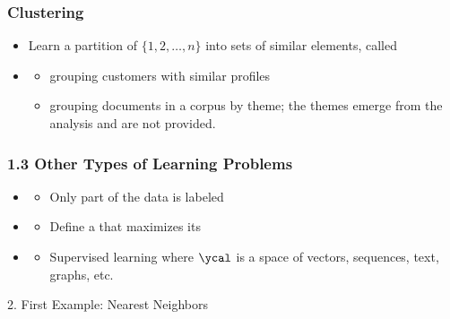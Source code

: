 \begin{frame}
  \frametitle{Clustering}
  \begin{itemize}
  \item[] Learn a partition of $\{1, 2, \dots, n\}$ into sets
    of similar elements, called 
  \item {}
    \begin{itemize}
    \item {} grouping customers with similar profiles
    \item {} grouping documents in a corpus by
      theme; the themes emerge from the analysis and are not provided.
    \end{itemize}
  \end{itemize}
\end{frame}

\begin{frame}
  \frametitle{1.3 Other Types of Learning Problems}
  
  \begin{itemize}
  \item {}
    \begin{itemize}
    \item[] Only part of the data is labeled
    \end{itemize}
  \item {}
    \begin{itemize}
    \item[] Define a  that maximizes its  
    \end{itemize}
  \item {}
    \begin{itemize}
    \item[] Supervised learning where $\ycal$ is a space of vectors,
      sequences, text, graphs, etc.
    \end{itemize}
  \end{itemize}
\end{frame}

\begin{frame}
  \begin{center}
    \large{2. First Example: Nearest Neighbors}
  \end{center}
\end{frame}

